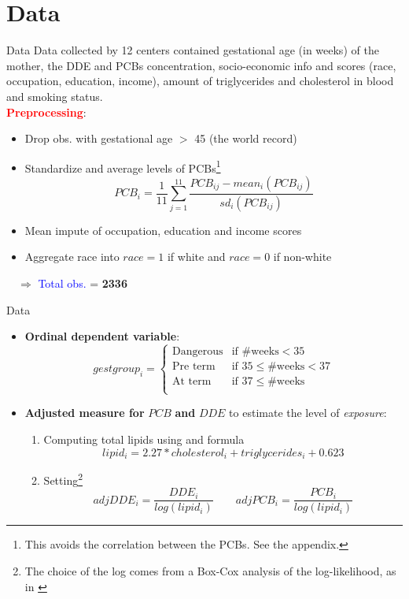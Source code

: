 \documentclass{beamer}
\begin{document}
\section{Data}
\begin{frame}{Data}
Data collected by 12 centers contained gestational age (in weeks) of the mother, the DDE and PCBs concentration, socio-economic info and scores (race, occupation, education, income), amount of triglycerides and cholesterol in blood and smoking status. \\
\medskip 
\textcolor{red}{\textbf{Preprocessing}}:
\begin{itemize}
	\item Drop obs. with gestational age $>$ 45 (the world record)
	\item Standardize and average levels of PCBs\footnote{This avoids the correlation between the PCBs. See the appendix.}
	$$PCB_i = \frac{1}{11}\sum_{j=1}^{11} \frac{PCB_{ij} - mean_i(PCB_{ij})}{sd_i(PCB_{ij})}$$
	\item Mean impute of occupation, education and income scores 
	\item Aggregate race into $race = 1$ if white and $race=0$ if non-white
\end{itemize}
$\quad \Longrightarrow$ \textcolor{blue}{Total obs.} = \textbf{2336}
\end{frame}


\begin{frame}{Data}
\small
\begin{itemize}
	\item \textbf{Ordinal dependent variable}:
	$$gestgroup_i = 
	\begin{cases}
	\textrm{Dangerous} & \text{if } \text{\#weeks} < 35 \\
	\textrm{Pre term } & \text{if }  35 \le \text{\#weeks} < 37 \\
	\textrm{At term  } & \text{if }  37 \le \text{\#weeks} \\
	\end{cases}$$
	\item \textbf{Adjusted measure for} $PCB$ \textbf{and} $DDE$ to estimate the level of \textit{exposure}:
	\begin{enumerate}
		\item Computing total lipids using \cite{Phillips1989} and \cite{Bernert2007} formula $$lipid_i =  2.27 * cholesterol_i + triglycerides_i + 0.623$$ 
		\item Setting\footnote{The choice of the log comes from a Box-Cox analysis of the log-likelihood, as in \cite{Li_Long_Duns}}
		$$adjDDE_i = \frac{DDE_i}{log(lipid_i)} \qquad adjPCB_i = \frac{PCB_i}{log(lipid_i)}$$
	\end{enumerate}
\end{itemize}
\end{frame}
\end{document}
